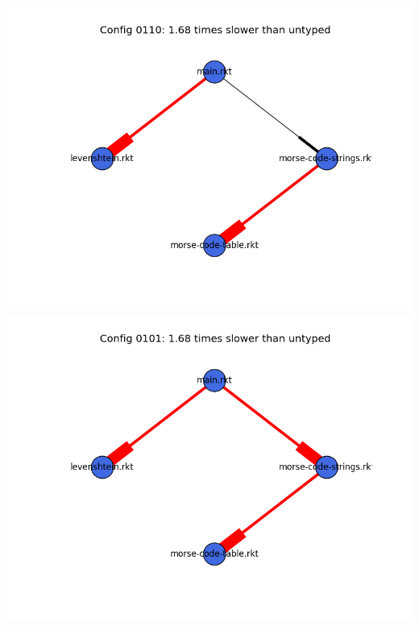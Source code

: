 \documentclass{article}
\begin{document}
\begin{itemize}
\includegraphics[width=\textwidth]{morse-code-module-graph-0110.png}
\includegraphics[width=\textwidth]{morse-code-module-graph-0101.png}
\end{itemize}
\end{document}
